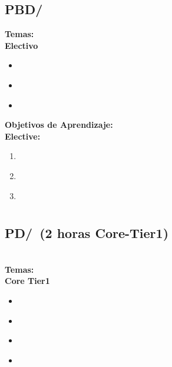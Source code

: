 \subsection{PBD/\PBDGamePlatforms}\label{sec:BOK:PBDGamePlatforms}
\noindent \textbf{Temas:}\\
\noindent \textbf{Electivo}
\begin{itemize}
	\item \PBDGamePlatformsTopicTypesOf\label{sec:BOK:PBDGamePlatformsTopicTypesOf}
	\item \PBDGamePlatformsTopicGame\label{sec:BOK:PBDGamePlatformsTopicGame}
	\item \PBDGamePlatformsTopicGamePlatform\label{sec:BOK:PBDGamePlatformsTopicGamePlatform}
\end{itemize}


\noindent \textbf{Objetivos de Aprendizaje:}\\
\noindent \textbf{Elective:}
\begin{enumerate}
	\setcounter{enumi}{0}
	\item \PBDGamePlatformsLODesignAndSimpleA\xspace[\PBDGamePlatformsLODesignAndSimpleALevel]\label{sec:BOK:PBDGamePlatformsLODesignAndSimpleA}
	\item \PBDGamePlatformsLODescribeTheGame\xspace[\PBDGamePlatformsLODescribeTheGameLevel]\label{sec:BOK:PBDGamePlatformsLODescribeTheGame}
	\item \PBDGamePlatformsLOCompareAndProgrammingPurpose\xspace[\PBDGamePlatformsLOCompareAndProgrammingPurposeLevel]\label{sec:BOK:PBDGamePlatformsLOCompareAndProgrammingPurpose}
\end{enumerate}




\section{\PD}\label{sec:BOK:PD}
\PDBOKDescription


\subsection{PD/\PDParallelismFundamentals~(2 horas Core-Tier1)}\label{sec:BOK:PDParallelismFundamentals}
\PDParallelismFundamentalsDescription\\
\noindent \textbf{Temas:}\\
\noindent \textbf{Core Tier1}
\begin{itemize}
	\item \PDParallelismFundamentalsTopicMultiple\label{sec:BOK:PDParallelismFundamentalsTopicMultiple}
	\item \PDParallelismFundamentalsTopicGoals\label{sec:BOK:PDParallelismFundamentalsTopicGoals}
	\item \PDParallelismFundamentalsTopicParallelism\label{sec:BOK:PDParallelismFundamentalsTopicParallelism}
	\item \PDParallelismFundamentalsTopicProgramming\label{sec:BOK:PDParallelismFundamentalsTopicProgramming}
\end{itemize}


